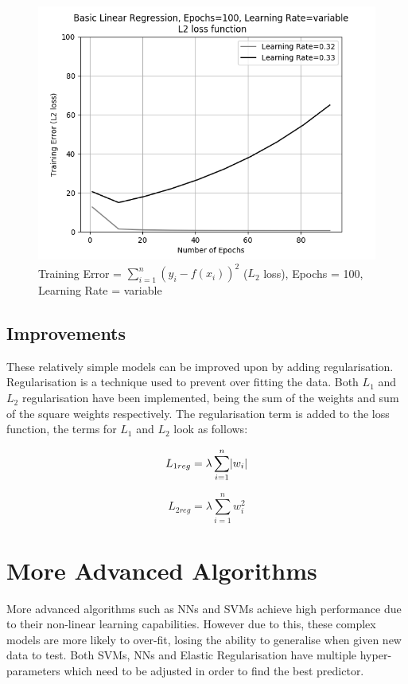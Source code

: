 \documentclass[10pt,twocolumn,letterpaper]{article}
\DeclarePairedDelimiter\abs{\lvert}{\rvert}%
\begin{document}
\begin{figure}[h]
	\begin{center}
		\includegraphics[width=0.9\linewidth]{img/linrbreak.png}
	\end{center}
	\caption{Training Error = $\sum_{i = 1}^{n} (y_i - f(x_i))^2$ ($L_2$ loss), Epochs = 100, Learning Rate = variable}
	\label{fig:break}
\end{figure}

\subsection{Improvements}
These relatively simple models can be improved upon by adding regularisation. Regularisation is a technique used to prevent over fitting the data. Both $L_1$ and $L_2$ regularisation have been implemented, being the sum of the weights and sum of the square weights respectively. The regularisation term is added to the loss function, the terms for $L_1$ and $L_2$ look as follows:

\noindent\begin{minipage}{.5\linewidth}
	\begin{equation}
	L_{1reg} = \lambda \sum_{i = 1}^{n} \abs{w_i}
	\end{equation}
\end{minipage}%
\begin{minipage}{.5\linewidth}
	\begin{equation}
	L_{2reg} = \lambda \sum_{i = 1}^{n} w_i^2
	\end{equation}
\end{minipage}

\section{More Advanced Algorithms}
More advanced algorithms such as NNs and SVMs achieve high performance due to their non-linear learning capabilities. However due to this, these complex models are more likely to over-fit, losing the ability to generalise when given new data to test. Both SVMs, NNs and Elastic Regularisation have multiple hyper-parameters which need to be adjusted in order to find the best predictor.
\end{document}
